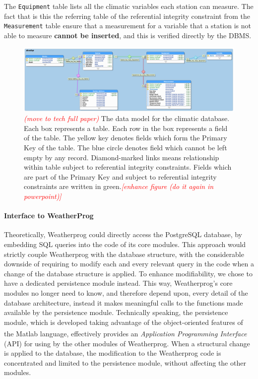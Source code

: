 \documentclass[authoryear,preprint,review,12pt]{elsarticle}
\newcommand{\note}[1]{\emph{\textcolor{red}{#1}}}
\begin{document}
The \texttt{Equipment} table lists all the climatic variables each station can measure. The fact that is this the referring table of the referential integrity constraint from the \texttt{Measurement} table ensure that a measurement for a variable that a station is not able to measure \textbf{cannot be inserted}, and this is verified directly by the DBMS.

\begin{figure}
	\includegraphics[scale=.26]{ERD}
	\caption{ \note{(move to tech full paper)} The data model for the climatic database. Each box represents a table. Each row in the box represents a field of the table. The yellow key denotes fields which form the Primary Key of the table. The blue circle denotes field which cannot be left empty by any record. Diamond-marked links means relationship within table subject to referential integrity constraints. Fields which are part of the Primary Key and subject to referential integrity constraints are written in green.\note{[enhance figure (do it again in powerpoint)]}}
	\label{ERD}
\end{figure}

\paragraph{Interface to WeatherProg}
Theoretically, Weatherprog could directly access the PostgreSQL database, by embedding SQL queries into the code of its core modules. This approach would strictly couple Weatherprog with the database structure, with the considerable downside of requiring to modify each and every relevant query in the code when a change of the database structure is applied. To enhance modifiability, we chose to have a dedicated persistence module instead. This way, Weatherprog's core modules no longer need to know, and therefore depend upon, every detail of the database architecture, instead it makes meaningful calls to the functions made available by the persistence module. Technically speaking, the persistence module, which is developed taking advantage of the object-oriented features of the Matlab\textsuperscript{\circledR} language, effectively provides an \emph{Application Programming Interface} (API) for using by the other modules of Weatherprog. When a structural change is applied to the database, the modification to the Weatherprog code is concentrated and limited to the persistence module, without affecting the other modules.
\end{document}
